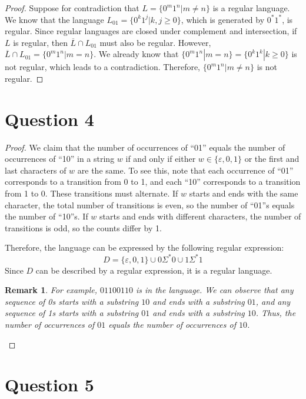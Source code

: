 \documentclass[a4paper, UTF-8]{article}
\theoremstyle{plain}
\newtheorem{remark}{\indent Remark}[section]
\begin{document}
\begin{proof} 
Suppose for contradiction that $L = \{0^m1^n | m\ne n \}$ is a regular language.
We know that the language $L_{01} = \{0^k1^j | k, j \geq 0\}$, which is generated by $0^*1^*$, is regular.
Since regular languages are closed under complement and intersection, if $L$ is regular, then $\overline{L} \cap L_{01}$ must also be regular.
However, $\overline{L} \cap L_{01} = \{0^m1^n | m = n\}$.
We already know that $\{0^m1^n | m = n\} = \{0^k1^k | k\geq 0\}$ is not regular, which leads to a contradiction.
Therefore, $\{0^m1^n | m\ne n \}$ is not regular.
\end{proof}

\section{Question 4} 

\begin{proof}
We claim that the number of occurrences of ``01'' equals the number of occurrences of ``10'' in a string $w$ if and only if either $w \in \{\varepsilon, 0, 1\}$ or the first and last characters of $w$ are the same.
To see this, note that each occurrence of ``01'' corresponds to a transition from 0 to 1, and each ``10'' corresponds to a transition from 1 to 0. These transitions must alternate.
If $w$ starts and ends with the same character, the total number of transitions is even, so the number of ``01''s equals the number of ``10''s.
If $w$ starts and ends with different characters, the number of transitions is odd, so the counts differ by 1.

Therefore, the language can be expressed by the following regular expression:
$$D = \{\varepsilon, 0, 1\} \cup 0\Sigma^*0 \cup 1\Sigma^*1$$
Since $D$ can be described by a regular expression, it is a regular language.

\begin{remark}
    For example, $01100110$ is in the language.
    We can observe that any sequence of 0s starts with a substring $10$ and ends with a substring $01$, and any sequence of 1s starts with a substring $01$ and ends with a substring $10$.
    Thus, the number of occurrences of $01$ equals the number of occurrences of $10$.
\end{remark}

\end{proof}

\section{Question 5} 
\end{document}
